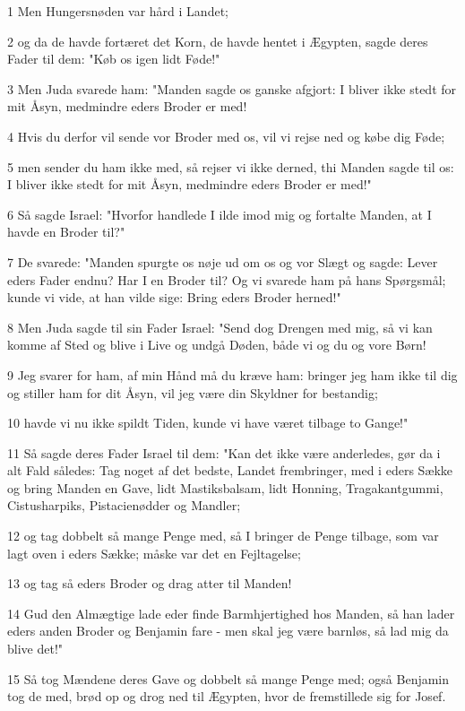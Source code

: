 \par 1 Men Hungersnøden var hård i Landet;
\par 2 og da de havde fortæret det Korn, de havde hentet i Ægypten, sagde deres Fader til dem: "Køb os igen lidt Føde!"
\par 3 Men Juda svarede ham: "Manden sagde os ganske afgjort: I bliver ikke stedt for mit Åsyn, medmindre eders Broder er med!
\par 4 Hvis du derfor vil sende vor Broder med os, vil vi rejse ned og købe dig Føde;
\par 5 men sender du ham ikke med, så rejser vi ikke derned, thi Manden sagde til os: I bliver ikke stedt for mit Åsyn, medmindre eders Broder er med!"
\par 6 Så sagde Israel: "Hvorfor handlede I ilde imod mig og fortalte Manden, at I havde en Broder til?"
\par 7 De svarede: "Manden spurgte os nøje ud om os og vor Slægt og sagde: Lever eders Fader endnu? Har I en Broder til? Og vi svarede ham på hans Spørgsmål; kunde vi vide, at han vilde sige: Bring eders Broder herned!"
\par 8 Men Juda sagde til sin Fader Israel: "Send dog Drengen med mig, så vi kan komme af Sted og blive i Live og undgå Døden, både vi og du og vore Børn!
\par 9 Jeg svarer for ham, af min Hånd må du kræve ham: bringer jeg ham ikke til dig og stiller ham for dit Åsyn, vil jeg være din Skyldner for bestandig;
\par 10 havde vi nu ikke spildt Tiden, kunde vi have været tilbage to Gange!"
\par 11 Så sagde deres Fader Israel til dem: "Kan det ikke være anderledes, gør da i alt Fald således: Tag noget af det bedste, Landet frembringer, med i eders Sække og bring Manden en Gave, lidt Mastiksbalsam, lidt Honning, Tragakantgummi, Cistusharpiks, Pistacienødder og Mandler;
\par 12 og tag dobbelt så mange Penge med, så I bringer de Penge tilbage, som var lagt oven i eders Sække; måske var det en Fejltagelse;
\par 13 og tag så eders Broder og drag atter til Manden!
\par 14 Gud den Almægtige lade eder finde Barmhjertighed hos Manden, så han lader eders anden Broder og Benjamin fare - men skal jeg være barnløs, så lad mig da blive det!"
\par 15 Så tog Mændene deres Gave og dobbelt så mange Penge med; også Benjamin tog de med, brød op og drog ned til Ægypten, hvor de fremstillede sig for Josef.
